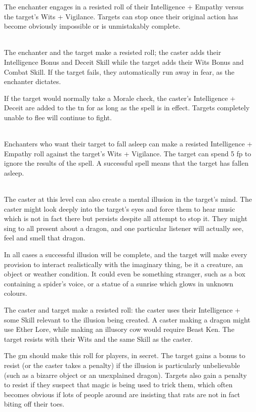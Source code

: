 \documentclass[titlepage,a4paper,openany]{book}
\begin{document}
\begin{multicols}{2}
The enchanter engages in a resisted roll of their Intelligence + Empathy versus the target's Wits + Vigilance. Targets can stop once their original action has become obviously impossible or is unmistakably complete.

\\
The enchanter and the target make a resisted roll; the caster adds their Intelligence Bonus and Deceit Skill while the target adds their Wits Bonus and Combat Skill. If the target fails, they automatically run away in fear, as the enchanter dictates.

If the target would normally take a Morale check, the caster's Intelligence + Deceit are added to the \gls{tn} for as long as the spell is in effect. Targets completely unable to flee will continue to fight.

\\
Enchanters who want their target to fall asleep can make a resisted Intelligence + Empathy roll against the target's Wits + Vigilance. The target can spend 5 \gls{fp} to ignore the results of the spell. A successful spell means that the target has fallen asleep.

\\
The caster at this level can also create a mental illusion in the target's mind. The caster might look deeply into the target's eyes and force them to hear music which is not in fact there but persists despite all attempt to stop it. They might sing to all present about a dragon, and one particular listener will actually see, feel and smell that dragon.

In all cases a successful illusion will be complete, and the target will make every provision to interact realistically with the imaginary thing, be it a creature, an object or weather condition. It could even be something stranger, such as a box containing a spider's voice, or a statue of a sunrise which glows in unknown colours.

The caster and target make a resisted roll: the caster uses their Intelligence + some Skill relevant to the illusion being created. A caster making a dragon might use Ether Lore, while making an illusory cow would require Beast Ken. The target resists with their Wits and the same Skill as the caster.

The \gls{gm} should make this roll for players, in secret. The target gains a bonus to resist (or the caster takes a penalty) if the illusion is particularly unbelievable (such as a bizarre object or an unexplained dragon). Targets also gain a penalty to resist if they suspect that magic is being used to trick them, which often becomes obvious if lots of people around are insisting that rats are not in fact biting off their toes.


\end{multicols}
\end{document}
